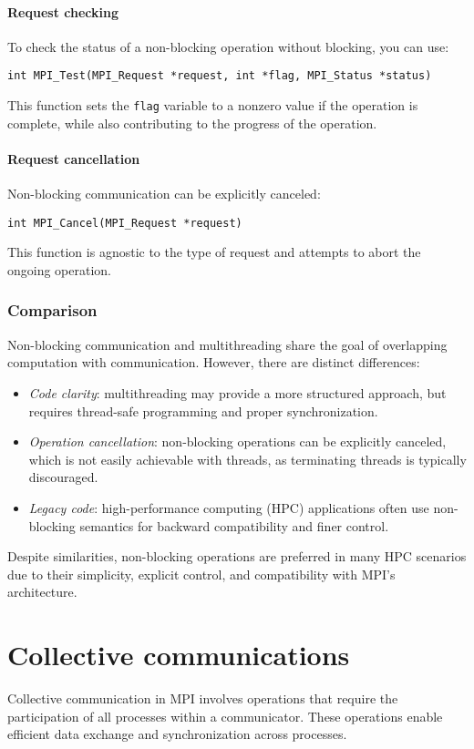 \paragraph*{Request checking}
To check the status of a non-blocking operation without blocking, you can use:
\begin{lstlisting}[style=C]
int MPI_Test(MPI_Request *request, int *flag, MPI_Status *status)
\end{lstlisting}
This function sets the \texttt{flag} variable to a nonzero value if the operation is complete, while also contributing to the progress of the operation.

\paragraph*{Request cancellation}
Non-blocking communication can be explicitly canceled:
\begin{lstlisting}[style=C]
int MPI_Cancel(MPI_Request *request)
\end{lstlisting}
This function is agnostic to the type of request and attempts to abort the ongoing operation.

\subsubsection{Comparison}
Non-blocking communication and multithreading share the goal of overlapping computation with communication. However, there are distinct differences:
\begin{itemize}
    \item \textit{Code clarity}: multithreading may provide a more structured approach, but requires thread-safe programming and proper synchronization.
    \item \textit{Operation cancellation}: non-blocking operations can be explicitly canceled, which is not easily achievable with threads, as terminating threads is typically discouraged.
    \item \textit{Legacy code}: high-performance computing (HPC) applications often use non-blocking semantics for backward compatibility and finer control.
\end{itemize}
Despite similarities, non-blocking operations are preferred in many HPC scenarios due to their simplicity, explicit control, and compatibility with MPI's architecture.

\section{Collective communications}
Collective communication in MPI involves operations that require the participation of all processes within a communicator. 
These operations enable efficient data exchange and synchronization across processes. 


